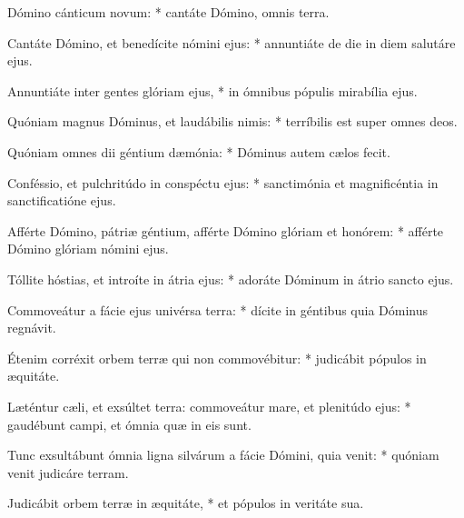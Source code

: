\begin{psalmus}

     Dómino cánticum novum: * can\-táte Dómino, omnis terra.

    Cantáte Dómino, et be\-ne\-dí\-ci\-te nómini ejus: * annuntiáte de die in diem salutáre ejus.

    Annuntiáte inter gentes glóriam ejus, * in ómnibus pópulis mirabília ejus.

    Quóniam magnus Dóminus, et laudábilis nimis: * terríbilis est super omnes deos.

    Quóniam omnes dii géntium dæmónia: * Dóminus autem cælos fecit.

    Conféssio, et pulchritúdo in conspéctu ejus: * sanctimónia et magnificéntia in sanctificatióne ejus.

    Afférte Dómino, pátriæ géntium, afférte Dómino glóriam et honórem: * afférte Dómino glóriam nómini ejus.

    Tóllite hóstias, et introíte in átria ejus: * adoráte Dóminum in átrio sancto ejus.

    Commoveátur a fácie ejus univérsa terra: * dícite in géntibus quia Dóminus regnávit.

    Étenim corréxit orbem terræ qui non commovébitur: * judicábit pópulos in æquitáte.

    Læténtur cæli, et exsúltet terra: commoveátur mare, et plenitúdo ejus: * gaudébunt campi, et ómnia quæ in eis sunt.

    Tunc exsultábunt ómnia ligna silvárum a fácie Dómini, quia venit: * quóniam venit judicáre terram.

    Judicábit orbem terræ in æquitáte, * et pópulos in veritáte sua.

\end{psalmus}
